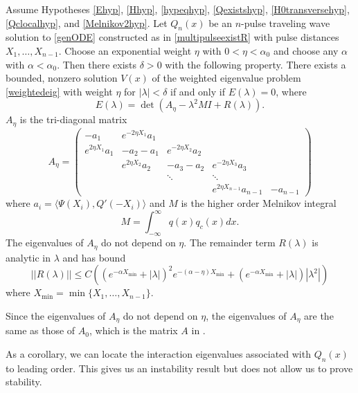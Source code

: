 \documentclass[thesis.tex]{subfiles}
\begin{document}
\begin{theorem}\label{expwtstabtheorem}
Assume Hypotheses \ref{Ehyp}, \ref{Hhyp}, \ref{hypeqhyp}, \ref{Qexistshyp}, \ref{H0transversehyp}, \ref{Qclocalhyp}, and \ref{Melnikov2hyp}. Let $Q_n(x)$ be an $n$-pulse traveling wave solution to \cref{genODE} constructed as in \cref{multipulseexistR} with pulse distances $X_1, \dots, X_{n-1}$. Choose an exponential weight $\eta$ with $0 < \eta < \alpha_0$ and choose any $\alpha$  with $\alpha < \alpha_0$. Then there exists $\delta > 0$ with the following property. There exists a bounded, nonzero solution $V(x)$ of the weighted eigenvalue problem \eqref{weightedeig} with weight $\eta$ for $|\lambda| < \delta$ if and only if $E(\lambda) = 0$, where
\[
E(\lambda) = \det \left( A_\eta - \lambda^2 M I + R(\lambda) \right).
\]
$A_\eta$ is the tri-diagonal matrix
\begin{equation}\label{Aeta}
A_\eta = \begin{pmatrix}
-a_1 & e^{-2 \eta X_1} a_1 \\
e^{2 \eta X_1} a_1 & -a_2 - a_1 & e^{-2 \eta X_2} a_2 \\
& e^{2 \eta X_2} a_2 & -a_3 - a_2 & e^{-2 \eta X_3} a_3 \\
&& \ddots & \ddots \\
& & & e^{2 \eta X_{n-1}} a_{n-1} & -a_{n-1} 
\end{pmatrix}
\end{equation}
where $a_i = \langle \Psi(X_i), Q'(-X_i) \rangle$ and $M$ is the higher order Melnikov integral
\begin{equation*}
M = \int_{-\infty}^\infty q(x) q_c(x) dx.
\end{equation*}
The eigenvalues of $A_\eta$ do not depend on $\eta$. The remainder term $R(\lambda)$ is analytic in $\lambda$ and has bound
\begin{equation*}
||R(\lambda)|| \leq C 
\left( (e^{-\alpha X_{\min}} + |\lambda|)^2 e^{-(\alpha - \eta)X_{\min}}  
+ (e^{-\alpha X_{\min}} + |\lambda| )|\lambda^2| \right)
\end{equation*}
where $X_{\min} = \min\{X_1, \dots, X_{n-1}\}$.
\end{theorem}

\begin{remark}
Since the eigenvalues of $A_\eta$ do not depend on $\eta$, the eigenvalues of $A_\eta$ are the same as those of $A_0$, which is the matrix $A$ in \cite[Theorem 2]{Sandstede1998}.
\end{remark}

As a corollary, we can locate the interaction eigenvalues associated with $Q_n(x)$ to leading order. This gives us an instability result but does not allow us to prove stability.
\end{document}
